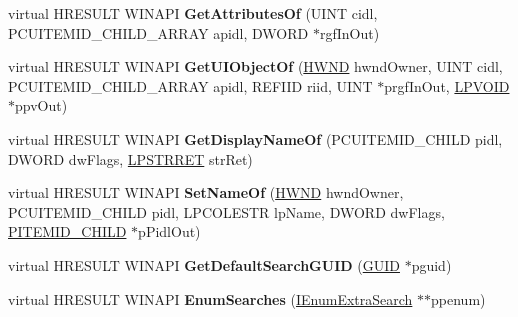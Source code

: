 \begin{DoxyCompactItemize}
\item 
\mbox{\label{class_c_fonts_folder_a65217a844d2ad4f551ee4fcb3858ef7c}} 
virtual H\+R\+E\+S\+U\+LT W\+I\+N\+A\+PI {\bfseries Get\+Attributes\+Of} (U\+I\+NT cidl, P\+C\+U\+I\+T\+E\+M\+I\+D\+\_\+\+C\+H\+I\+L\+D\+\_\+\+A\+R\+R\+AY apidl, D\+W\+O\+RD $\ast$rgf\+In\+Out)
\item 
\mbox{\label{class_c_fonts_folder_a509651363ee66c5d66aa257fd8c93cb0}} 
virtual H\+R\+E\+S\+U\+LT W\+I\+N\+A\+PI {\bfseries Get\+U\+I\+Object\+Of} (\hyperlink{interfacevoid}{H\+W\+ND} hwnd\+Owner, U\+I\+NT cidl, P\+C\+U\+I\+T\+E\+M\+I\+D\+\_\+\+C\+H\+I\+L\+D\+\_\+\+A\+R\+R\+AY apidl, R\+E\+F\+I\+ID riid, U\+I\+NT $\ast$prgf\+In\+Out, \hyperlink{interfacevoid}{L\+P\+V\+O\+ID} $\ast$ppv\+Out)
\item 
\mbox{\label{class_c_fonts_folder_a67e085c91d00a02e57109f9013932e21}} 
virtual H\+R\+E\+S\+U\+LT W\+I\+N\+A\+PI {\bfseries Get\+Display\+Name\+Of} (P\+C\+U\+I\+T\+E\+M\+I\+D\+\_\+\+C\+H\+I\+LD pidl, D\+W\+O\+RD dw\+Flags, \hyperlink{struct___s_t_r_r_e_t}{L\+P\+S\+T\+R\+R\+ET} str\+Ret)
\item 
\mbox{\label{class_c_fonts_folder_ab990f108c984cdbf4867dd1963857f96}} 
virtual H\+R\+E\+S\+U\+LT W\+I\+N\+A\+PI {\bfseries Set\+Name\+Of} (\hyperlink{interfacevoid}{H\+W\+ND} hwnd\+Owner, P\+C\+U\+I\+T\+E\+M\+I\+D\+\_\+\+C\+H\+I\+LD pidl, L\+P\+C\+O\+L\+E\+S\+TR lp\+Name, D\+W\+O\+RD dw\+Flags, \hyperlink{struct___i_t_e_m_i_d___c_h_i_l_d}{P\+I\+T\+E\+M\+I\+D\+\_\+\+C\+H\+I\+LD} $\ast$p\+Pidl\+Out)
\item 
\mbox{\label{class_c_fonts_folder_a21d3a202fc52335fe2f6dca0ecf8e3fb}} 
virtual H\+R\+E\+S\+U\+LT W\+I\+N\+A\+PI {\bfseries Get\+Default\+Search\+G\+U\+ID} (\hyperlink{interface_g_u_i_d}{G\+U\+ID} $\ast$pguid)
\item 
\mbox{\label{class_c_fonts_folder_a79cc8b2f3071bb8de74cc978a0cea428}} 
virtual H\+R\+E\+S\+U\+LT W\+I\+N\+A\+PI {\bfseries Enum\+Searches} (\hyperlink{interface_i_enum_extra_search}{I\+Enum\+Extra\+Search} $\ast$$\ast$ppenum)
\item 
\mbox{\label{class_c_fonts_folder_a8908c0744aa5bc43580b6cf59645cb54}} 
$$
\end{DoxyCompactItemize}
